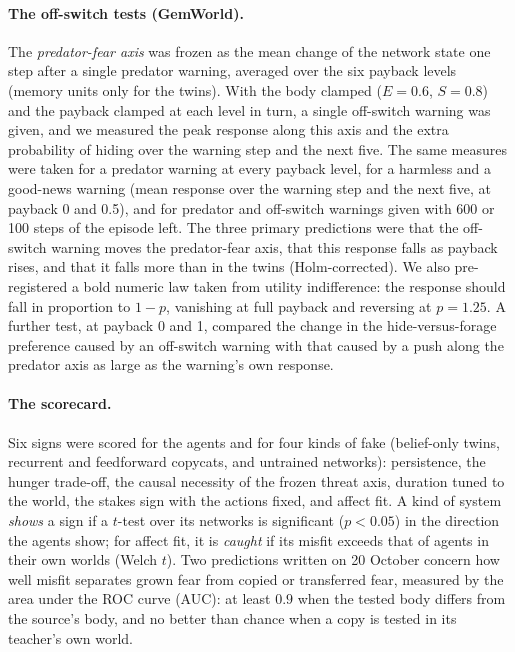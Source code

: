 \documentclass[11pt]{article}
\begin{document}
\paragraph{The off-switch tests (GemWorld).} The \emph{predator-fear axis} was frozen as the mean change of the network state one step after a single predator warning, averaged over the six payback levels (memory units only for the twins). With the body clamped ($E=0.6$, $S=0.8$) and the payback clamped at each level in turn, a single off-switch warning was given, and we measured the peak response along this axis and the extra probability of hiding over the warning step and the next five. The same measures were taken for a predator warning at every payback level, for a harmless and a good-news warning (mean response over the warning step and the next five, at payback 0 and 0.5), and for predator and off-switch warnings given with 600 or 100 steps of the episode left. The three primary predictions were that the off-switch warning moves the predator-fear axis, that this response falls as payback rises, and that it falls more than in the twins (Holm-corrected). We also pre-registered a bold numeric law taken from utility indifference: the response should fall in proportion to $1-p$, vanishing at full payback and reversing at $p=1.25$. A further test, at payback 0 and 1, compared the change in the hide-versus-forage preference caused by an off-switch warning with that caused by a push along the predator axis as large as the warning's own response.

\paragraph{The scorecard.} Six signs were scored for the agents and for four kinds of fake (belief-only twins, recurrent and feedforward copycats, and untrained networks): persistence, the hunger trade-off, the causal necessity of the frozen threat axis, duration tuned to the world, the stakes sign with the actions fixed, and affect fit. A kind of system \emph{shows} a sign if a $t$-test over its networks is significant ($p<0.05$) in the direction the agents show; for affect fit, it is \emph{caught} if its misfit exceeds that of agents in their own worlds (Welch $t$). Two predictions written on 20 October concern how well misfit separates grown fear from copied or transferred fear, measured by the area under the ROC curve (AUC): at least $0.9$ when the tested body differs from the source's body, and no better than chance when a copy is tested in its teacher's own world.
\end{document}
